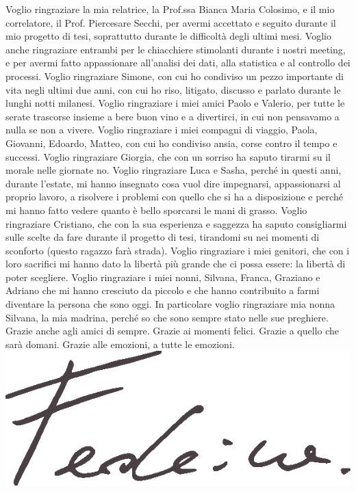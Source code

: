 Voglio ringraziare la mia relatrice, la Prof.ssa Bianca Maria Colosimo, e il mio correlatore, il Prof. Piercesare Secchi, per avermi accettato e seguito durante il mio progetto di tesi, soprattutto durante le difficoltà degli ultimi mesi. Voglio anche ringraziare entrambi per le chiacchiere stimolanti durante i nostri meeting, e per avermi fatto appassionare all'analisi dei dati, alla statistica e al controllo dei processi. Voglio ringraziare Simone, con cui ho condiviso un pezzo importante di vita negli ultimi due anni, con cui ho riso, litigato, discusso e parlato durante le lunghi notti milanesi. Voglio ringraziare i miei amici Paolo e Valerio, per tutte le serate trascorse insieme a bere buon vino e a divertirci, in cui non pensavamo a nulla se non a vivere. Voglio ringraziare i miei compagni di viaggio, Paola, Giovanni, Edoardo, Matteo, con cui ho condiviso ansia, corse contro il tempo e successi. Voglio ringraziare Giorgia, che con un sorriso ha saputo tirarmi su il morale nelle giornate no. Voglio ringraziare Luca e Sasha, perché in questi anni, durante l'estate, mi hanno insegnato cosa vuol dire impegnarsi, appassionarsi al proprio lavoro, a risolvere i problemi con quello che si ha a disposizione e perché mi hanno fatto vedere quanto è bello sporcarsi le mani di grasso. Voglio ringraziare Cristiano, che con la sua esperienza e saggezza ha saputo consigliarmi sulle scelte da fare durante il progetto di tesi, tirandomi su nei momenti di sconforto (questo ragazzo farà strada). Voglio ringraziare i miei genitori, che con i loro sacrifici mi hanno dato la libertà più grande che ci possa essere: la libertà di poter scegliere. Voglio ringraziare i miei nonni, Silvana, Franca, Graziano e Adriano che mi hanno cresciuto da piccolo e che hanno contribuito a farmi diventare la persona che sono oggi. In particolare voglio ringraziare mia nonna Silvana, la mia madrina, perché so che sono sempre stato nelle sue preghiere. Grazie anche agli amici di sempre. Grazie ai momenti felici. Grazie a quello che sarà domani. Grazie alle emozioni, a tutte le emozioni.
\\[1.5cm]
\includegraphics[width=0.2 \textwidth]{Images/firma.eps}
